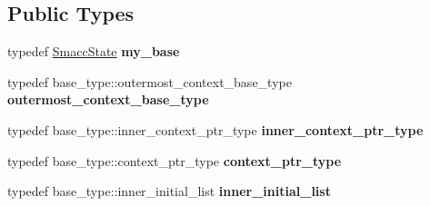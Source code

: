 \subsection*{Public Types}
\begin{DoxyCompactItemize}
\item 
typedef \hyperlink{classsmacc_1_1SmaccState}{Smacc\+State} {\bfseries my\+\_\+base}\hypertarget{classsmacc_1_1SmaccState_aac18be8c1314b97ccfd34cb28d1bb386}{}\label{classsmacc_1_1SmaccState_aac18be8c1314b97ccfd34cb28d1bb386}

\item 
typedef base\+\_\+type\+::outermost\+\_\+context\+\_\+base\+\_\+type {\bfseries outermost\+\_\+context\+\_\+base\+\_\+type}\hypertarget{classsmacc_1_1SmaccState_aaf76bbe2aa9dd73e3284605f84ab4b16}{}\label{classsmacc_1_1SmaccState_aaf76bbe2aa9dd73e3284605f84ab4b16}

\item 
typedef base\+\_\+type\+::inner\+\_\+context\+\_\+ptr\+\_\+type {\bfseries inner\+\_\+context\+\_\+ptr\+\_\+type}\hypertarget{classsmacc_1_1SmaccState_a65a772c2e2039e9a59148ba6ffb54d8a}{}\label{classsmacc_1_1SmaccState_a65a772c2e2039e9a59148ba6ffb54d8a}

\item 
typedef base\+\_\+type\+::context\+\_\+ptr\+\_\+type {\bfseries context\+\_\+ptr\+\_\+type}\hypertarget{classsmacc_1_1SmaccState_a0e15b77514301039f6bc093a9d3f6425}{}\label{classsmacc_1_1SmaccState_a0e15b77514301039f6bc093a9d3f6425}

\item 
typedef base\+\_\+type\+::inner\+\_\+initial\+\_\+list {\bfseries inner\+\_\+initial\+\_\+list}\hypertarget{classsmacc_1_1SmaccState_acb4ac84bce421d39b594510a6b2df558}{}\label{classsmacc_1_1SmaccState_acb4ac84bce421d39b594510a6b2df558}

\end{DoxyCompactItemize}
